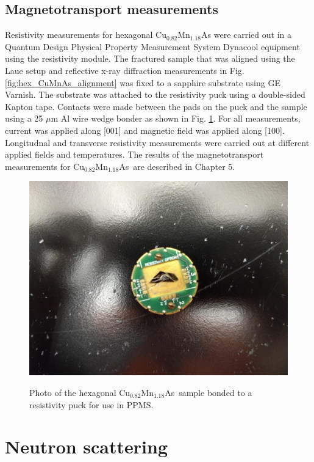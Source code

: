 \documentclass[letterpaper,10pt,doublespacing,edeposit]{uiucthesis2020}
\newcommand*{\cumnas}{Cu$_{0.82}$Mn$_{1.18}$As}
\begin{document}
\begin{mainmatter}
\subsection{Magnetotransport measurements}


Resistivity measurements for hexagonal Cu$_{0.82}$Mn$_{1.18}$As were carried out in a Quantum Design Physical Property Measurement System Dynacool equipment using the resistivity module. The fractured sample that was aligned using the Laue setup and reflective x-ray diffraction measurements in Fig. \ref{fig:hex_CuMnAs_alignment} was fixed to a sapphire substrate using GE Varnish. The substrate was attached to the resistivity puck using a double-sided Kapton tape. Contacts were made between the pads on the puck and the sample using a 25 $\mu$m Al wire wedge bonder as shown in Fig. \ref{fig:resistivity}. For all measurements, current was applied along [001] and magnetic field was applied along [100]. Longitudnal and transverse resistivity measurements were carried out at different applied fields and temperatures. The results of the magnetotransport measurements for \cumnas\  are described in Chapter 5.

\begin{figure}
\centering\includegraphics[width=0.5\columnwidth]{figures/ch3/resistivity.jpg} \\
\caption{\label{fig:resistivity}
Photo of the hexagonal \cumnas\ sample bonded to a resistivity puck for use in PPMS.
}
\end{figure}



\section{Neutron scattering}


\end{mainmatter}
\end{document}
